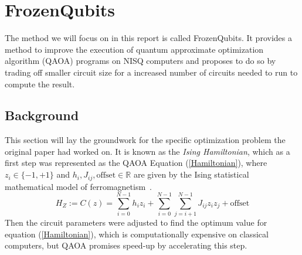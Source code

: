 \section{FrozenQubits}
The method we will focus on in this report is called FrozenQubits. It provides a method to improve the execution of quantum approximate optimization algorithm (QAOA) programs on NISQ computers and proposes to do so by trading off smaller circuit size for a increased number of circuits needed to run to compute the result.
\subsection{Background}
This section will lay the groundwork for the specific optimization problem the original paper had worked on. It is known as the \textit{Ising Hamiltonian}, which as a first step was represented as the QAOA Equation (\ref{Hamiltonian}), where $z_i\in \{-1,+1\}$ and $h_i, J_{ij},\text{offset}\in\mathbb{R}$ are given by the Ising statistical mathematical model of ferromagnetism~\cite{Ising}.
\begin{equation}\label{Hamiltonian}
    H_Z:=C(z)=\sum^{N-1}_{i=0}h_iz_i+\sum^{N-1}_{i=0}\sum^{N-1}_{j=i+1}J_{ij}z_iz_j+\text{offset}
\end{equation}
Then the circuit parameters were adjusted to find the optimum value for equation (\ref{Hamiltonian}), which is computationally expensive on classical computers, but QAOA promises speed-up by accelerating this step.
